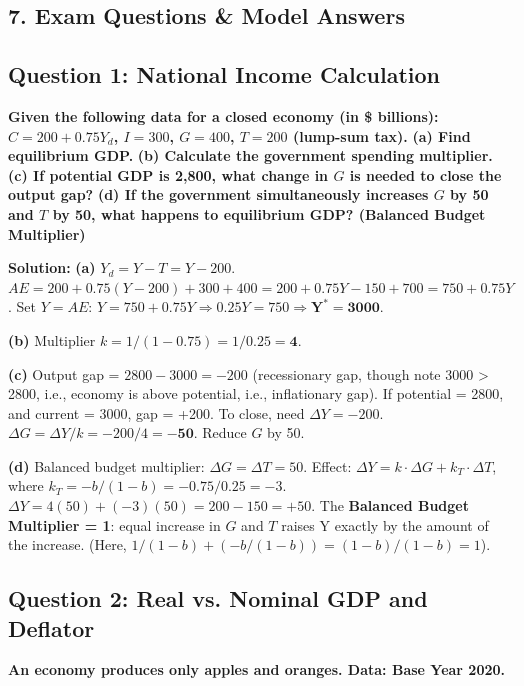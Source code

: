\documentclass[10pt,a4paper]{article}
\begin{document}
\begin{multicols}{2}
\section*{7. Exam Questions \& Model Answers}

\subsection*{Question 1: National Income Calculation}
\textbf{Given the following data for a closed economy (in \$ billions): $C = 200 + 0.75Y_d$, $I = 300$, $G = 400$, $T = 200$ (lump-sum tax).}
\textbf{(a) Find equilibrium GDP.}
\textbf{(b) Calculate the government spending multiplier.}
\textbf{(c) If potential GDP is 2,800, what change in $G$ is needed to close the output gap?}
\textbf{(d) If the government simultaneously increases $G$ by 50 and $T$ by 50, what happens to equilibrium GDP? (Balanced Budget Multiplier)}

\vspace{0.05cm}
\textbf{Solution:}
\vspace{0.05cm}
\textbf{(a)} $Y_d = Y - T = Y - 200$. $AE = 200 + 0.75(Y-200) + 300 + 400 = 200 + 0.75Y - 150 + 700 = 750 + 0.75Y$. Set $Y = AE$: $Y = 750 + 0.75Y \Rightarrow 0.25Y = 750 \Rightarrow \mathbf{Y^* = 3000}$.

\textbf{(b)} Multiplier $k = 1/(1-0.75) = 1/0.25 = \mathbf{4}$.

\textbf{(c)} Output gap = $2800 - 3000 = -200$ (recessionary gap, though note 3000 > 2800, i.e., economy is above potential, i.e., inflationary gap). If potential = 2800, and current = 3000, gap = +200. To close, need $\Delta Y = -200$. $\Delta G = \Delta Y / k = -200 / 4 = \mathbf{-50}$. Reduce $G$ by 50.

\textbf{(d)} Balanced budget multiplier: $\Delta G = \Delta T = 50$. Effect: $\Delta Y = k \cdot \Delta G + k_T \cdot \Delta T$, where $k_T = -b/(1-b) = -0.75/0.25 = -3$. $\Delta Y = 4(50) + (-3)(50) = 200 - 150 = +50$.
The \textbf{Balanced Budget Multiplier = 1}: equal increase in $G$ and $T$ raises Y exactly by the amount of the increase. (Here, $1/(1-b) + (-b/(1-b)) = (1-b)/(1-b) = 1$).

\vspace{0.2cm}

\subsection*{Question 2: Real vs. Nominal GDP and Deflator}
\textbf{An economy produces only apples and oranges. Data: Base Year 2020.}


\end{multicols}
\end{document}
